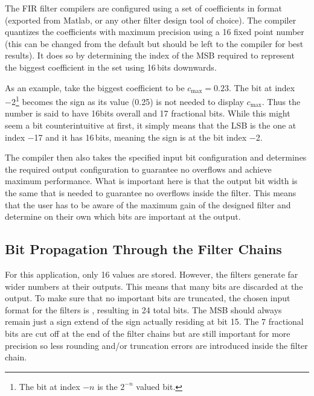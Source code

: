 The  FIR filter  compilers  are  configured using  a  set  of coefficients  in
 format (exported from Matlab, or any other filter design tool of
choice). The compiler quantizes the  coefficients with maximum precision using
a \SI{16}{\bit} fixed  point number (this can be changed  from the default but
should be  left to the compiler  for best results). It does  so by determining
the index of the MSB required to  represent the biggest coefficient in the set
using \num{16}\,bits downwards.

As an example, take the biggest coefficient to be $c_\mathrm{max} = 0.23$. The
bit at  index \num{-2}\footnote{The bit at  index $-n$ is the  $2^{-n}$ valued
bit.} becomes  the sign  as its  value (\num{0.25}) is  not needed  to display
$c_\mathrm{max}$. Thus the  number is  said to have  \num{16}\si{bits} overall
and \num{17} fractional bits. While this  might seem a bit counterintuitive at
first, it simply means  that the LSB is the one at index  \num{-17} and it has
\num{16}\,bits, meaning the sign is at the bit index \num{-2}.

The  compiler  then also  takes  the  specified  input bit  configuration  and
determines the  required output  configuration to  guarantee no  overflows and
achieve maximum  performance.  What is important  here is that the  output bit
width  is  the same  that  is  needed to  guarantee  no  overflows inside  the
filter. This means that  the user has to  be aware of the maximum  gain of the
designed filter  and determine on  their own which  bits are important  at the
output.

%
%
\subsection{Bit Propagation Through the Filter Chains} %
\label{subsec:fpga:bit_propagation}

For  this  application, only  \SI{16}{\bit}  values  are stored. However,  the
filters generate  far wider numbers  at their  outputs.  This means  that many
bits are  discarded at the  output.  To make sure  that no important  bits are
truncated, the chosen  input format for the filters  is , resulting
in \num{24} total bits. The MSB should always remain just a sign extend of the
sign actually  residing at bit  \num{15}. The \num{7} fractional bits  are cut
off at the end of the filter chains but are still important for more precision
so less  rounding and/or  truncation errors are  introduced inside  the filter
chain.

